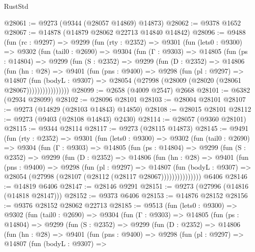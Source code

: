 \begin{lexlean}{RustStd}
\begin{coremodule}
{\begin{coremodule}
{{{{{{{{{{{{{{{{{{{{{{{{{{{{{{{{{{{{{{{{{{{{{{{{{{{{{{{@28061 := @9273 (@9344 (@28057 @14869) @14873)
@28062 := @9378 @1652
@28067 := @14878 (@14879 @28062 @22713 @14840 @14842)
@28096 := @9488
    (fun (rc : @9297) =>
    @9299
      (fun (rty : @2352) =>
      @9301
        (fun (lets0 : @9300) =>
        @9302
          (fun (tail0 : @2690) =>
          @9304
            (fun (Γ : @9303) =>
            @14805
              (fun (ps : @14804) =>
              @9299
                (fun (S : @2352) =>
                @9299
                  (fun (D : @2352) =>
                  @14806
                    (fun (hn : @28) =>
                    @9401
                      (fun (pns : @9400) =>
                      @9298
                        (fun (pl : @9297) =>
                        @14807
                          (fun (bodyL : @9307) =>
                          @28054 (@27998 (@28009 (@28020 (@28061 @28067))))))))))))))))
@28099 := @2658 (@4009 @2547) @2668
@28101 := @6382 (@2934 @28099)
@28102 := @28096 @28101
@28103 := @28004 @28101
@28107 := @9273 (@14829 (@28103 @14843) @14850)
@28108 := @28015 @28101
@28112 := @9273 (@9403 (@28108 @14843) @2430)
@28114 := @28057 (@9360 @28101)
@28115 := @9344 @28114
@28117 := @9273 (@28115 @14873)
@28145 := @9491
    (fun (rty : @2352) =>
    @9301
      (fun (lets0 : @9300) =>
      @9302
        (fun (tail0 : @2690) =>
        @9304
          (fun (Γ : @9303) =>
          @14805
            (fun (ps : @14804) =>
            @9299
              (fun (S : @2352) =>
              @9299
                (fun (D : @2352) =>
                @14806
                  (fun (hn : @28) =>
                  @9401
                    (fun (pns : @9400) =>
                    @9298
                      (fun (pl : @9297) =>
                      @14807
                        (fun (bodyL : @9307) =>
                        @28054 (@27998 (@28107 (@28112 (@28117 @28067)))))))))))))))
    @6406
@28146 := @14819 @6406
@28147 := @28146 @9291
@28151 := @9273 (@27996 (@14816 (@14818 @28147)))
@28152 := @9373 @6406
@28153 := @14876 @28152
@28156 := @9376 @28152 @28062 @22713
@28185 := @9513
    (fun (lets0 : @9300) =>
    @9302
      (fun (tail0 : @2690) =>
      @9304
        (fun (Γ : @9303) =>
        @14805
          (fun (ps : @14804) =>
          @9299
            (fun (S : @2352) =>
            @9299
              (fun (D : @2352) =>
              @14806
                (fun (hn : @28) =>
                @9401
                  (fun (pns : @9400) =>
                  @9298
                    (fun (pl : @9297) =>
                    @14807
                      (fun (bodyL : @9307) =>
}}}}}}}}}}}}}}}}}}}}}}}}}}}}}}}}}}}}}}}}}}}}}}}}}}}}}}}
\end{coremodule}}
\end{coremodule}
\end{lexlean}
